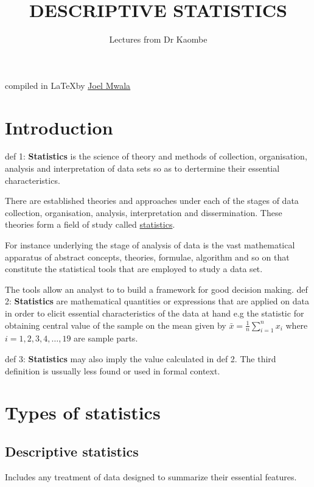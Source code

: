 \documentclass[12pt]{article}
\title{DESCRIPTIVE STATISTICS}
\author{Lectures from Dr Kaombe}
\begin{document}
\maketitle
\vspace*{11cm}
\begin{center}
    compiled in \LaTeX \nobreakspace by \href{https://bento.me/joelmwala}{\underline{Joel Mwala}}
\end{center}

\newpage
\tableofcontents


\newpage

\section{Introduction} %
\setlength{\parskip}{0.5em} %
def 1: \textbf{Statistics} is the science of theory and methods of collection, organisation, analysis and interpretation of data sets so as to dertermine their essential characteristics.

There are established theories and approaches under each of the stages of data collection, organisation, analysis, interpretation and dissermination. These theories form a field of study called \underline{statistics}.

For instance underlying the stage of analysis of data is the vast mathematical apparatus of abstract concepts, theories, formulae, algorithm and so on that constitute the statistical tools that are employed to study a data set.

The tools allow an analyst to to build a framework for good decision making.
\newline
def 2: \textbf{Statistics} are mathematical quantities or expressions that are applied on data in order to elicit essential characteristics of the data at hand e.g the statistic for obtaining central value of the sample on the mean given by $\bar{x} = \frac{1}{n}\sum_{i = 1}^{n} x_i$ where $i = 1,2,3,4, \dots,19$ are sample parts.

def 3: \textbf{Statistics} may also imply the value calculated in def 2.
The third definition is ussually less found or used in formal context.
\newpage

\section{Types of statistics} %
\subsection{Descriptive statistics}
Includes any treatment of data designed to summarize their essential features.
\end{document}
